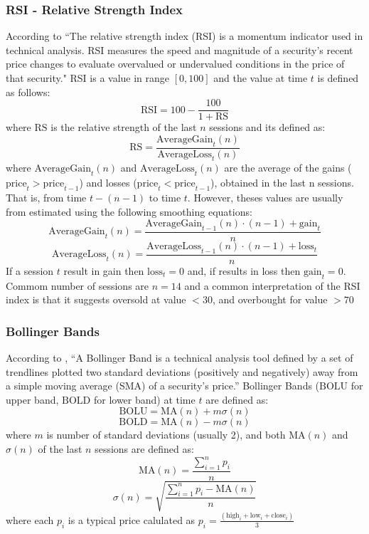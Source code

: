 \documentclass{article}
\begin{document}
\subsubsection*{RSI - Relative Strength Index}
According to \cite{rsi} ``The relative strength index (RSI) is a momentum indicator used in technical analysis. 
RSI measures the speed and magnitude of a security's recent price changes to evaluate overvalued or 
undervalued conditions in the price of that security."
RSI is a value in range $[0, 100]$ and the value at time $t$ is defined as follows:
$$
    \text{RSI} = 100 - \frac{100}{1 + \text{RS}}
$$
where $\text{RS}$ is the relative strength of the last $n$ sessions and its defined as:
$$
    \text{RS} = \frac{\text{AverageGain}_t(n)}{\text{AverageLoss}_t(n)}
$$
where $\text{AverageGain}_t(n)$ and $\text{AverageLoss}_t(n)$ are the average of the gains ($\text{price}_t > \text{price}_{t-1}$) 
and losses ($\text{price}_t < \text{price}_{t-1}$), obtained in the last n sessions. That is, from time $t - (n - 1)$ to time $t$. 
However, theses values are usually from estimated using the following smoothing equations:
$$
    \text{AverageGain}_t(n) = \frac{\text{AverageGain}_{t-1}(n) \cdot (n-1) + \text{gain}_t}{n}
$$ 
$$
    \text{AverageLoss}_t(n) = \frac{\text{AverageLoss}_{t-1}(n) \cdot (n-1) + \text{loss}_t}{n}
$$ 
If a session $t$ result in gain then $\text{loss}_t = 0$ and, if results in loss then $\text{gain}_t = 0$. Commom number of sessions
are $n = 14$ and a common interpretation of the RSI index is that it suggests oversold at value $< 30$, and overbought for value $ > 70$ 

\subsubsection*{Bollinger Bands}
According to \cite{bb}, ``A Bollinger Band is a technical analysis tool defined by a set of trendlines plotted two standard deviations
(positively and negatively) away from a simple moving average (SMA) of a security's price.'' 
Bollinger Bands ($\text{BOLU}$ for upper band, $\text{BOLD}$ for lower band) at time $t$ are defined as:
$$
\text{BOLU} = \text{MA}(n) + m\sigma(n)
$$
$$
\text{BOLD} = \text{MA}(n) - m\sigma(n)
$$
where $m$ is number of standard deviations (usually 2), and both $\text{MA}(n)$ and $\sigma(n)$ of the last $n$ sessions are defined as:
$$
\text{MA}(n) = \frac{\sum_{i = 1}^{n}{p_i}}{n}
$$
$$
\sigma(n) = \sqrt{\frac{\sum_{i = 1}^{n}{p_i - \text{MA}(n)}}{n}}
$$
where each $p_i$ is a typical price calulated as $p_i = \frac{(\text{high}_i + \text{low}_i + \text{close}_i)}{3}$
\end{document}
